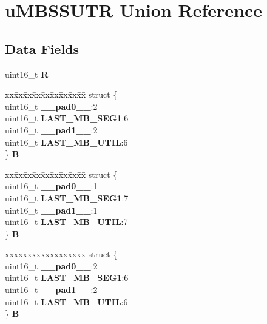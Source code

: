 \hypertarget{unionuMBSSUTR}{}\section{u\+M\+B\+S\+S\+U\+TR Union Reference}
\label{unionuMBSSUTR}
\subsection*{Data Fields}
\begin{DoxyCompactItemize}
\item 
\mbox{\label{unionuMBSSUTR_a1c479afbdf8dcea9422e31dde08b306f}} 
uint16\+\_\+t {\bfseries R}
\item 
\mbox{\label{unionuMBSSUTR_ae0195ea0dd6287ff0bcb6bffef8886fd}} 
\begin{tabbing}
xx\=xx\=xx\=xx\=xx\=xx\=xx\=xx\=xx\=\kill
struct \{\\
\>uint16\_t {\bfseries \_\_pad0\_\_}:2\\
\>uint16\_t {\bfseries LAST\_MB\_SEG1}:6\\
\>uint16\_t {\bfseries \_\_pad1\_\_}:2\\
\>uint16\_t {\bfseries LAST\_MB\_UTIL}:6\\
\} {\bfseries B}\\

\end{tabbing}\item 
\mbox{\label{unionuMBSSUTR_a287b1a8a14dfcf51a27e6663d04aff43}} 
\begin{tabbing}
xx\=xx\=xx\=xx\=xx\=xx\=xx\=xx\=xx\=\kill
struct \{\\
\>uint16\_t {\bfseries \_\_pad0\_\_}:1\\
\>uint16\_t {\bfseries LAST\_MB\_SEG1}:7\\
\>uint16\_t {\bfseries \_\_pad1\_\_}:1\\
\>uint16\_t {\bfseries LAST\_MB\_UTIL}:7\\
\} {\bfseries B}\\

\end{tabbing}\item 
\mbox{\label{unionuMBSSUTR_ad30e2a63bcfd8030359cefe555ec78ff}} 
\begin{tabbing}
xx\=xx\=xx\=xx\=xx\=xx\=xx\=xx\=xx\=\kill
struct \{\\
\>uint16\_t {\bfseries \_\_pad0\_\_}:2\\
\>uint16\_t {\bfseries LAST\_MB\_SEG1}:6\\
\>uint16\_t {\bfseries \_\_pad1\_\_}:2\\
\>uint16\_t {\bfseries LAST\_MB\_UTIL}:6\\
\} {\bfseries B}\\


\end{tabbing}
\end{DoxyCompactItemize}
